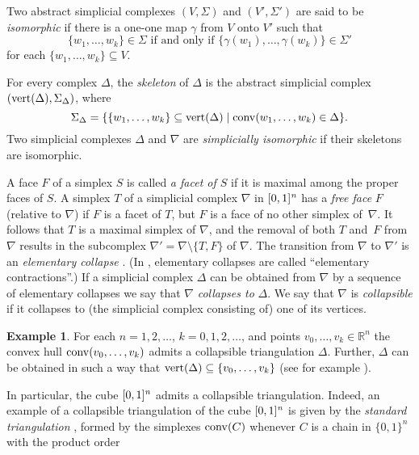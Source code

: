 \documentclass[reqno, draft]{amsart}
\theoremstyle{definition}
\newtheorem{example}[theorem]{Example}
\begin{document}
Two abstract simplicial complexes $(V,\Sigma)$ and $( V',\Sigma')$
are said to be {\it  isomorphic} 
if there is a one-one map $\gamma$ from $V$ onto $V'$
such that  
\[
  \{w_{1},\ldots,w_{k}\}\in \Sigma
        \mbox{ if and only if }
  \{\gamma(w_{1}),\ldots,\gamma(w_{k})\}\in \Sigma'
\]
for each   $\{w_{1},\ldots,w_{k}\}\subseteq  V$.

For every complex $\Delta$,  the {\it skeleton} of  $\Delta$
is the  abstract simplicial complex $(\operatorname{{\rm vert}}(\Delta),\Sigma_{\Delta})$, 
where
\[
  \Sigma_{\Delta}=\{\{w_{1},\ldots,w_{k}\}\subseteq 
  \operatorname{{\rm vert}}(\Delta)\mid \operatorname{{\rm conv}}(w_{1},\ldots,w_{k})\in\Delta\}.
\]
Two simplicial complexes $\Delta$ and $\nabla$ are 
 {\it  simplicially isomorphic} if their skeletons are isomorphic.

 A face $F$ of a simplex $S$ is called {\it a facet of $S$} 
if it is maximal among the proper faces of $S$.
A simplex $T$ of a simplicial complex $\nabla$ in ${[0,1]^{\it n}}$ 
has a {\it free face} $F$ (relative to $\nabla$) 
if $F$ is a  facet of $T$, but $F$ is a face 
of no other simplex of~$\nabla$.
It follows that $T$ is a maximal simplex of $\nabla$,
and the removal  of both $T$ and~$F$ from $\nabla$
results in the subcomplex 
$\nabla'= \nabla\setminus\{T,F\}$ of $\nabla$.
The transition  from $\nabla$ to $\nabla'$ 
is an {\it elementary collapse}  \cite[Definition~III.7.2]{Ewa1996}. 
(In \cite[p.247]{Whi1939}, elementary collapses 
are called ``elementary contractions''.)
If a simplicial complex $\Delta$ can be obtained from $\nabla$
by a sequence of elementary collapses
we say that $\nabla$  {\it collapses to}  $\Delta$.
We say that $\nabla$ is {\it collapsible} if it collapses to 
(the simplicial complex consisting of) 
one of its vertices.

\begin{example}\label{Ex:CollapsibleCube}
For each $n=1,2,\ldots$, $k=0,1,2,\ldots$, and points $v_0,\ldots, v_k\in{\mathbb{R}}^n$ 
the convex hull $\operatorname{{\rm conv}}(v_0,\ldots, v_k)$ 
admits a collapsible triangulation $\Delta$. 
Further, $\Delta$ can be obtained in such a way that 
$\operatorname{{\rm vert}}(\Delta)\subseteq\{v_0,\ldots, v_k\}$ 
(see for example \cite[Theorem~2.6]{Ewa1996}). 

In particular, the cube ${[0,1]^{\it n}}$ admits a collapsible triangulation.
Indeed, 
an example of a collapsible triangulation of the cube ${[0,1]^{\it n}}$
 is given by the  {\em standard triangulation} \cite[p. 60]{Se1982}, 
formed by the simplexes $\operatorname{{\rm conv}}(C)$ 
whenever $C$ is a chain in  $\{0,1\}^{n}$ with the product order 

\end{example}
\end{document}
